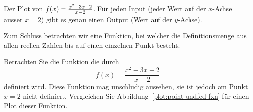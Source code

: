 \begin{marginfigure}[0in]
\caption{Der Plot von $f(x)=\protect\frac{x^2 - 3x + 2}{x-2}$. Für jeden Input (jeder Wert auf der $x$-Achse ausser $x=2$) gibt es genau einen Output (Wert auf der $y$-Achse).}
\label{plot:point undfed fxn}
\end{marginfigure}

Zum Schluss betrachten wir eine Funktion, bei welcher die Definitionsmenge aus allen reellen Zahlen bis auf einen einzelnen Punkt besteht.

\begin{example}
Betrachten Sie die Funktion die durch
\[
f(x) = \frac{x^2 - 3x + 2}{x-2}
\]
definiert wird. Diese Funktion mag unschludig aussehen, sie ist jedoch am Punkt $x=2$ nicht definiert. Vergleichen Sie Abbildung~\ref{plot:point undfed fxn} für einen Plot dieser Funktion.
\end{example}



